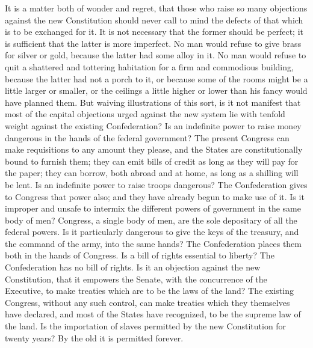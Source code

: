 It is a matter both of wonder and regret, that those who raise so many objections against the new Constitution should never call to mind the defects of that which is to be exchanged for it. 
It is not necessary that the former should be perfect; it is sufficient that the latter is more imperfect. 
No man would refuse to give brass for silver or gold, because the latter had some alloy in it. 
No man would refuse to quit a shattered and tottering habitation for a firm and commodious building, because the latter had not a porch to it, or because some of the rooms might be a little larger or smaller, or the ceilings a little higher or lower than his fancy would have planned them. 
But waiving illustrations of this sort, is it not manifest that most of the capital objections urged against the new system lie with tenfold weight against the existing Confederation? 
Is an indefinite power to raise money dangerous in the hands of the federal government? 
The present Congress can make requisitions to any amount they please, and the States are constitutionally bound to furnish them; they can emit bills of credit as long as they will pay for the paper; they can borrow, both abroad and at home, as long as a shilling will be lent. 
Is an indefinite power to raise troops dangerous? 
The Confederation gives to Congress that power also; and they have already begun to make use of it. 
Is it improper and unsafe to intermix the different powers of government in the same body of men? 
Congress, a single body of men, are the sole depositary of all the federal powers. 
Is it particularly dangerous to give the keys of the treasury, and the command of the army, into the same hands? 
The Confederation places them both in the hands of Congress. 
Is a bill of rights essential to liberty? 
The Confederation has no bill of rights. 
Is it an objection against the new Constitution, that it empowers the Senate, with the concurrence of the Executive, to make treaties which are to be the laws of the land? 
The existing Congress, without any such control, can make treaties which they themselves have declared, and most of the States have recognized, to be the supreme law of the land. 
Is the importation of slaves permitted by the new Constitution for twenty years? 
By the old it is permitted forever.

